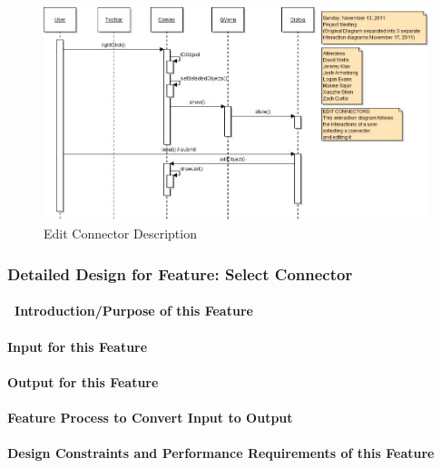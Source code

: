 \documentclass[twoside,letterpaper]{article}
\begin{document}
{\begin{figure}[h]
\centering
\includegraphics[width=6.0in]{IntEditConn.jpg}
\caption{Edit Connector Description}
\end{figure}

\clearpage



% 
%

\subsubsection{Detailed Design for Feature: Select Connector }
\paragraph[\ Introduction/Purpose of this Feature]
{\ Introduction/Purpose of this Feature}
{

}

\paragraph[Input for this Feature]{Input for this Feature}
{

}

\paragraph{Output for this Feature}
{

}

\paragraph{Feature Process to Convert Input to Output}
{

}

\paragraph{Design Constraints and Performance Requirements of this Feature}
{

}}
\end{document}
